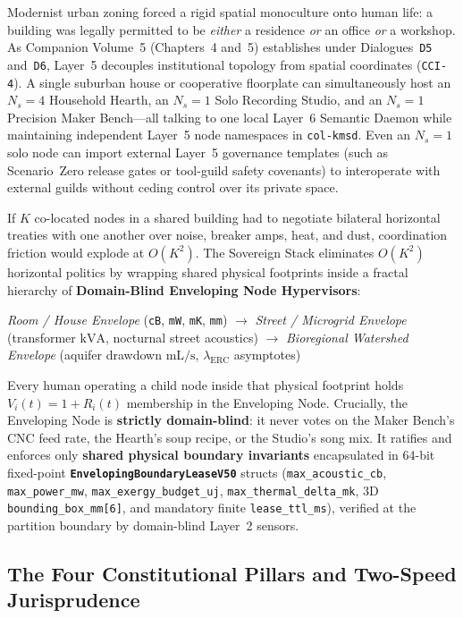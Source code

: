 Modernist urban zoning forced a rigid spatial monoculture onto human life: a building was legally permitted to be \textit{either} a residence \textit{or} an office \textit{or} a workshop. As Companion Volume~5 (Chapters~4 and~5) establishes under Dialogues~\texttt{D5} and~\texttt{D6}, Layer~5 decouples institutional topology from spatial coordinates (\texttt{CCI-4}). A single suburban house or cooperative floorplate can simultaneously host an $N_s = 4$ Household Hearth, an $N_s = 1$ Solo Recording Studio, and an $N_s = 1$ Precision Maker Bench---all talking to one local Layer~6 Semantic Daemon while maintaining independent Layer~5 node namespaces in \texttt{col-kmsd}. Even an $N_s = 1$ solo node can import external Layer~5 governance templates (such as Scenario~Zero release gates or tool-guild safety covenants) to interoperate with external guilds without ceding control over its private space.

If $K$ co-located nodes in a shared building had to negotiate bilateral horizontal treaties with one another over noise, breaker amps, heat, and dust, coordination friction would explode at $O(K^2)$. The Sovereign Stack eliminates $O(K^2)$ horizontal politics by wrapping shared physical footprints inside a fractal hierarchy of \textbf{Domain-Blind Enveloping Node Hypervisors}:
\begin{center}
\textit{Room / House Envelope} (\texttt{cB}, \texttt{mW}, \texttt{mK}, \texttt{mm}) $\longrightarrow$ \textit{Street / Microgrid Envelope} (transformer $\mathrm{kVA}$, nocturnal street acoustics) $\longrightarrow$ \textit{Bioregional Watershed Envelope} (aquifer drawdown $\mathrm{mL/s}$, $\lambda_{\mathrm{ERC}}$ asymptotes)
\end{center}
Every human operating a child node inside that physical footprint holds $V_i(t) = 1 + R_i(t)$ membership in the Enveloping Node. Crucially, the Enveloping Node is \textbf{strictly domain-blind}: it never votes on the Maker Bench's CNC feed rate, the Hearth's soup recipe, or the Studio's song mix. It ratifies and enforces only \textbf{shared physical boundary invariants} encapsulated in 64-bit fixed-point \textbf{\texttt{EnvelopingBoundaryLeaseV50}} structs (\texttt{max\_acoustic\_cb}, \texttt{max\_power\_mw}, \texttt{max\_exergy\_budget\_uj}, \texttt{max\_thermal\_delta\_mk}, 3D \texttt{bounding\_box\_mm[6]}, and mandatory finite \texttt{lease\_ttl\_ms}), verified at the partition boundary by domain-blind Layer~2 sensors.

\subsection{The Four Constitutional Pillars and Two-Speed Jurisprudence}
\label{subsec:l5-four-pillars-jurisprudence}

